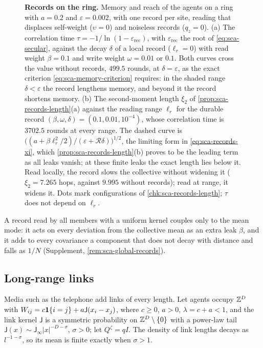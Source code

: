 \begin{figure}[t]
  \centering
  
  \caption{\textbf{Records on the ring.} Memory and reach of the agents on a ring with $a=0.2$ and $\varepsilon=0.002$, with one record per site, reading that displaces self-weight ($\upsilon=0$) and noiseless records ($q_z=0$). (a) The correlation time $\tau=-1/\ln(1-\varepsilon_{\mathrm{rec}})$, with $\varepsilon_{\mathrm{rec}}$ the root of \eqref{eq:sca-secular}, against the decay $\delta$ of a local record ($\ell_r=0$) with read weight $\beta=0.1$ and write weight $\omega=0.01$ or $0.1$. Both curves cross the value without records, $499.5$ rounds, at $\delta=\varepsilon$, as the exact criterion \eqref{eq:sca-memory-criterion} requires: in the shaded range $\delta<\varepsilon$ the record lengthens memory, and beyond it the record shortens memory. (b) The second-moment length $\xi_2$ of \cref{prop:sca-records-length}(a) against the reading range $\ell_r$ for the durable record $(\beta,\omega,\delta)=(0.1,0.01,10^{-4})$, whose correlation time is $3702.5$ rounds at every range. The dashed curve is $\bigl((a+\beta\ell_r^2/2)/(\varepsilon+\mathcal R\delta)\bigr)^{1/2}$, the limiting form in \eqref{eq:sca-records-xi}, which \cref{prop:sca-records-length}(b) proves to be the leading term as all leaks vanish; at these finite leaks the exact length lies below it. Read locally, the record slows the collective without widening it ($\xi_2=7.265$ hops, against $9.995$ without records); read at range, it widens it. Dots mark configurations of \cref{chk:sca-records-length}; $\tau$ does not depend on $\ell_r$.}
  \label{fig:sca-records}
\end{figure}

A record read by all members with a uniform kernel couples only to the mean mode: it acts on every deviation from the collective mean as an extra leak $\beta$, and it adds to every covariance a component that does not decay with distance and falls as $1/N$ (Supplement, \cref{rem:sca-global-records}).

\subsection{Long-range links}\label{sec:sca-longrange}

Media such as the telephone add links of every length. Let agents occupy $\mathbb{Z}^D$ with $W_{ij}=c\mathbf{1}\{i=j\}+a\mathsf J(x_i-x_j)$, where $c\ge0$, $a>0$, $\lambda=c+a<1$, and the link kernel $\mathsf J$ is a symmetric probability on $\mathbb{Z}^D\setminus\{0\}$ with a power-law tail $\mathsf J(x)\sim\mathsf J_\infty|x|^{-D-\sigma}$, $\sigma>0$; let $Q^\zeta=qI$. The density of link lengths decays as $l^{-1-\sigma}$, so its mean is finite exactly when $\sigma>1$.

